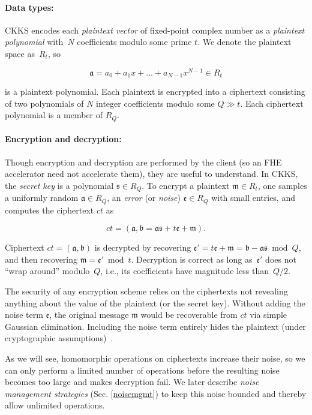 \paragraph{Data types:}
CKKS encodes each \emph{plaintext vector} of fixed-point complex number as a
\emph{plaintext polynomial} with~$N$ coefficients modulo some prime $t$.
We denote the plaintext space as~$R_t$, so

\[\mathfrak{a} = a_0 + a_1x + ... + a_{N-1}x^{N-1} \in R_t\]

is a plaintext polynomial. Each plaintext is encrypted into a ciphertext
consisting of two polynomials of $N$ integer coefficients modulo some $Q \gg
t$. Each ciphertext polynomial is a member of $R_Q$.

\paragraph{Encryption and decryption:}
Though encryption and decryption are performed by the client (so an FHE
accelerator need not accelerate them), they are useful to understand. In CKKS,
the \textit{secret key} is a polynomial $\mathfrak{s} \in R_Q$. To encrypt a
plaintext $\mathfrak{m} \in R_t$, one samples a uniformly random $\mathfrak{a}
\in R_Q$, an \emph{error} (or \emph{noise}) $\mathfrak{e} \in R_Q$ with small
entries, and computes the ciphertext $ct$ as

\begin{equation*}
  ct = (\mathfrak{a}, \mathfrak{b} = \mathfrak{a}\mathfrak{s} + t \mathfrak{e} + \mathfrak{m}).
\end{equation*}

Ciphertext $ct = (\mathfrak{a}, \mathfrak{b})$ is decrypted by recovering
$\mathfrak{e}' = t\mathfrak{e} + \mathfrak{m} = \mathfrak{b} - \mathfrak{a}
\mathfrak{s} \bmod{Q}$, and then recovering $\mathfrak{m} = \mathfrak{e}' \bmod
t$.  Decryption is correct as long as~$\mathfrak{e}'$ does not ``wrap around''
modulo~$Q$, i.e., its coefficients have magnitude less than~$Q/2$.

The security of any encryption scheme relies on the ciphertexts not revealing
anything about the value of the plaintext (or the secret key). Without adding
the noise term $\mathfrak{e}$, the original message $\mathfrak{m}$ would be
recoverable from $ct$ via simple Gaussian elimination. Including the noise term
entirely hides the plaintext (under cryptographic
assumptions)~\cite{lyubashevsky:tact10:ideal}.

As we will see, homomorphic operations on ciphertexts increase their noise, so
we can only perform a limited number of operations before the resulting noise
becomes too large and makes decryption fail.  We later describe \emph{noise
management strategies} (Sec. \ref{noisemgmt}) to keep this noise bounded and
thereby allow unlimited operations.

